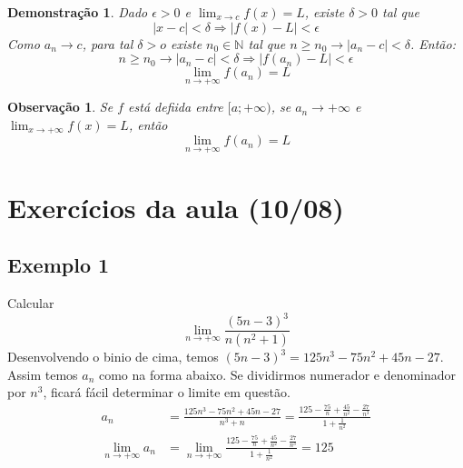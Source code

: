 \documentclass[12pt,openany]{book}
\newtheorem{demonstration}{Demonstração}
\newtheorem{obs}{Observação}
\begin{document}
\begin{demonstration}Dado $\epsilon > 0$ e $\displaystyle{\lim_{x \rightarrow c} f(x) = L}$, existe $\delta > 0$ tal que $$ |x-c| < \delta \Rightarrow |f(x) - L| < \epsilon $$ \hspace{5mm} Como $a_n \rightarrow c$, para tal $\delta > o$ existe $n_0 \in \mathds{N}$ tal que $n \geq n_0 \rightarrow |a_n - c| < \delta$. Então: $$n \geq n_0 \rightarrow |a_n - c| < \delta \Rightarrow |f(a_n) - L| < \epsilon$$ $$ \lim_{n \rightarrow +\infty} f(a_n) = L$$
\end{demonstration}

\begin{obs} Se $f$ está defiida entre $[a;+\infty)$, se $a_n \rightarrow +\infty$ e $\displaystyle{\lim_{x \rightarrow +\infty} f(x) =L}$, então $$\lim_{n \rightarrow +\infty} f(a_n) =L$$
\end{obs}

\section{Exercícios da aula (10/08)}
\label{sec:s22}

\subsection*{Exemplo 1}
\label{subsec:ex221}
\hspace{5mm}Calcular $$\lim_{n \rightarrow +\infty} \frac{(5n-3)^3}{n(n^2+1)}$$
Desenvolvendo o binio de cima, temos $(5n-3)^3 = 125n^3-75n^2+45n -27$. Assim temos $a_n$ como na forma abaixo. Se dividirmos numerador e denominador por $n^3$, ficará fácil determinar o limite em questão.
\begin{align*}
a_n &= \frac{125n^3-75n^2+45n -27}{n^3+n} =  \frac{125 - \frac{75}{n} + \frac{45}{n^2} - \frac{27}{n^3}}{1 + \frac{1}{n^2}} \\
\lim_{n \rightarrow + \infty} a_n &= \lim_{n \rightarrow + \infty} \frac{125 - \frac{75}{n} + \frac{45}{n^2} - \frac{27}{n^3}}{1 + \frac{1}{n^2}} = 125\\
\end{align*}
\end{document}
